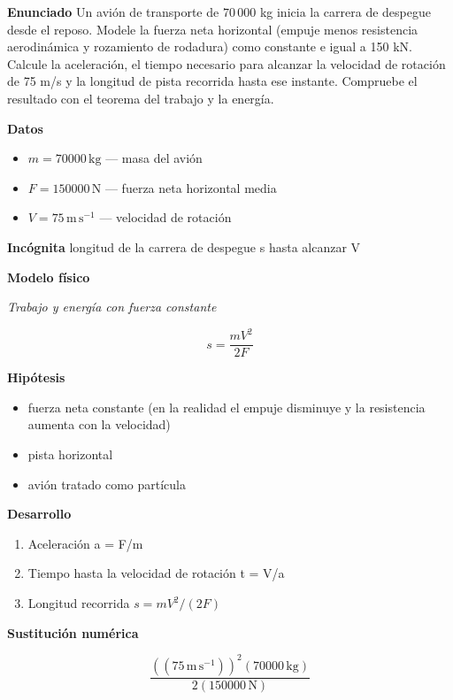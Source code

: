 \documentclass[10pt,openany]{book}
\begin{document}
\begin{tcolorbox}[title={Problema resuelto}, studiumworked, breakable]

\noindent\textbf{Enunciado}
Un avión de transporte de \(70\,000\) kg inicia la carrera de despegue desde el reposo. Modele la fuerza neta horizontal (empuje menos resistencia aerodinámica y rozamiento de rodadura) como constante e igual a 150 kN. Calcule la aceleración, el tiempo necesario para alcanzar la velocidad de rotación de 75 m/s y la longitud de pista recorrida hasta ese instante. Compruebe el resultado con el teorema del trabajo y la energía.

\noindent\textbf{Datos}
\begin{itemize}
\item $m = 70000\,\mathrm{kg}$ — masa del avión
\item $F = 150000\,\mathrm{N}$ — fuerza neta horizontal media
\item $V = 75\,\mathrm{m}\,\mathrm{s}^{-1}$ — velocidad de rotación
\end{itemize}

\noindent\textbf{Incógnita}
longitud de la carrera de despegue s hasta alcanzar V

\noindent\textbf{Modelo físico}

\noindent\textit{Trabajo y energía con fuerza constante}

\[
s = \frac{m V^{2}}{2F}
\]

\noindent\textbf{Hipótesis}
\begin{itemize}
\item fuerza neta constante (en la realidad el empuje disminuye y la resistencia aumenta con la velocidad)
\item pista horizontal
\item avión tratado como partícula
\end{itemize}

\noindent\textbf{Desarrollo}
\begin{enumerate}
\item
Aceleración a = F/m
\item
Tiempo hasta la velocidad de rotación t = V/a
\item
Longitud recorrida \(s = m V^2/(2F)\)
\end{enumerate}

\noindent\textbf{Sustitución numérica}

\[
\frac{\left(\left(75\,\mathrm{m}\,\mathrm{s}^{-1}\right)\right)^{2} \left(70000\,\mathrm{kg}\right)}{2 \left(150000\,\mathrm{N}\right)}
\]


\end{tcolorbox}
\end{document}
